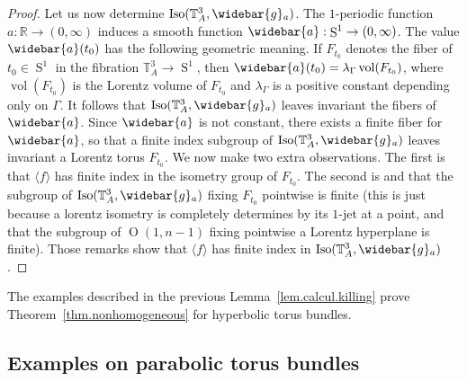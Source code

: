 \documentclass[11pt]{article}
\theoremstyle{definition}
\numberwithin{equation}{section}
\numberwithin{figure}{section}
\numberwithin{table}{section}
\DeclareMathOperator{\Iso}{Iso}
\DeclareMathOperator{\Omp}{O}%
\DeclareMathOperator{\Sop}{S}
\DeclareMathOperator{\vol}{vol}
\newcommand*\RR{\mathbb{R}}
\let\oldbar\bar
\renewcommand*{\bar}[1]{\mathchoice{\widebar{#1}}{\widebar{#1}}{\oldbar{#1}}{\oldbar{#1}}}
\renewcommand*{\overline}{\bar}
\begin{document}
\begin{proof}
Let us now determine $\Iso({\mathbb T}_A^3,\overline{g}_a)$. The $1$-periodic function $a: \RR \to (0,\infty)$ induces a smooth function $\overline{a}: \Sop^1 \to (0,\infty)$. The value $\overline{a}(t_0)$ has the following geometric meaning. If $F_{t_0}$ denotes the fiber of $t_0 \in \Sop^1$ in the fibration ${\mathbb T}_A^3 \to \Sop^1$, then $\overline{a}(t_0)=\lambda_{\Gamma}\vol(F_{t_0})$, where $\vol(F_{t_0})$ is the Lorentz volume of $F_{t_0}$ and $\lambda_{\Gamma}$ is a positive constant depending only on $\Gamma$. It follows that $\Iso({\mathbb T}_A^3,\overline{g}_a)$ leaves invariant the fibers of $\overline{a}$. Since $\overline{a}$ is not constant, there exists a finite fiber for $\overline{a}$, so that a finite index subgroup of $\Iso({\mathbb T}_A^3,\overline{g}_a)$ leaves invariant a Lorentz torus $F_{t_0}$. We now make two extra observations. The first is that $\langle f \rangle$ has finite index in the isometry group of $F_{t_0}$. The second is and that the subgroup of $\Iso({\mathbb T}_A^3,\overline{g}_a)$ fixing $F_{t_0}$ pointwise is finite (this is just because a lorentz isometry is completely determines by its $1$-jet at a point, and that the subgroup of $\Omp(1,n-1)$ fixing pointwise a Lorentz hyperplane is finite). Those remarks show that $\langle f \rangle$ has finite index in $\Iso({\mathbb T}_A^3,\overline{g}_a)$.
\end{proof}



The examples described in the previous Lemma~\ref{lem.calcul.killing} prove Theorem~\ref{thm.nonhomogeneous} for hyperbolic torus bundles.


\subsection{Examples on parabolic torus bundles}\label{sec.exemplesparaboliques0}
\end{document}
